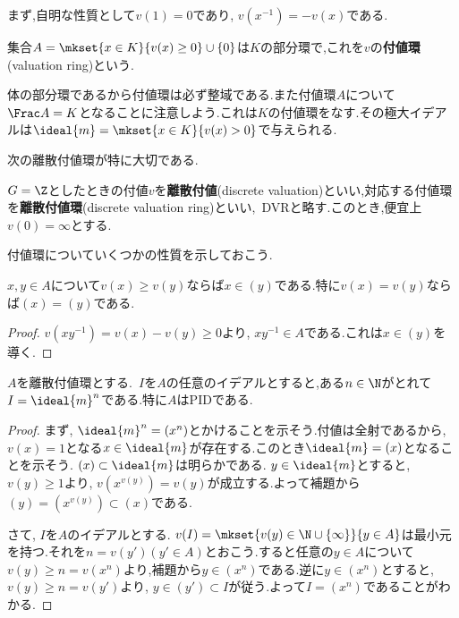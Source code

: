 まず,自明な性質として$v(1)=0$であり, $v(x^{-1})=-v(x)$である.

\begin{defi}
	集合$A=\mkset{x\in K}{v(x)\geq0}\cup\{0\}$は$K$の部分環で,これを$v$の\textbf{付値環}(valuation ring)という.
\end{defi}

体の部分環であるから付値環は必ず整域である.また付値環$A$について$\Frac A=K$となることに注意しよう.これは$K$の付値環をなす.その極大イデアルは$\ideal{m}=\mkset{x\in K}{v(x)>0}$で与えられる.

次の離散付値環が特に大切である.
\begin{defi}[離散付値]
	$G=\Z$としたときの付値$v$を\textbf{離散付値}(discrete valuation)といい,対応する付値環を\textbf{離散付値環}(discrete valuation ring)といい,~DVRと略す.このとき,便宜上$v(0)=\infty$とする.
\end{defi}

付値環についていくつかの性質を示しておこう.

\begin{lem}
	$x,y\in A$について$v(x)\geq v(y)$ならば$x\in (y)$である.特に$v(x)=v(y)$ならば$(x)=(y)$である.
\end{lem}

\begin{proof}
	$v(xy^{-1})=v(x)-v(y)\geq0$より, $xy^{-1}\in A$である.これは$x\in (y)$を導く.
\end{proof}

\begin{prop}\label{prop:離散付値環の性質}
	$A$を離散付値環とする.~$I$を$A$の任意のイデアルとすると,ある$n\in\N$がとれて$I=\ideal{m}^n$である.特に$A$はPIDである.
\end{prop}

\begin{proof}
	まず, $\ideal{m}^n=(x^n)$とかけることを示そう.付値は全射であるから, $v(x)=1$となる$x\in\ideal{m}$が存在する.このとき$\ideal{m}=(x)$となることを示そう. $(x)\subset\ideal{m}$は明らかである. $y\in\ideal{m}$とすると, $v(y)\geq1$より, $v(x^{v(y)})=v(y)$が成立する.よって補題から$(y)=(x^{v(y)})\subset(x)$である.
	
	さて, $I$を$A$のイデアルとする. $v(I)=\mkset{v(y)\in\N\cup\{\infty\}}{y\in A}$は最小元を持つ.それを$n=v(y') (y'\in A)$とおこう.すると任意の$y\in A$について$v(y)\geq n=v(x^n)$より,補題から$y\in (x^n)$である.逆に$y\in(x^n)$とすると, $v(y)\geq n=v(y')$より, $y\in(y')\subset I$が従う.よって$I=(x^n)$であることがわかる.
\end{proof}

